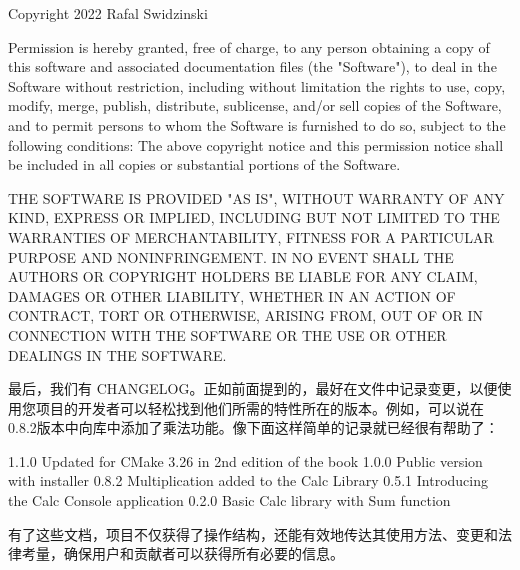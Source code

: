 \begin{shell}
Copyright 2022 Rafal Swidzinski

Permission is hereby granted, free of charge, to any person obtaining a
copy of this software and associated documentation files (the "Software"),
to deal in the Software without restriction, including without limitation
the rights to use, copy, modify, merge, publish, distribute, sublicense,
and/or sell copies of the Software, and to permit persons to whom the
Software is furnished to do so, subject to the following conditions:
The above copyright notice and this permission notice shall be included in
all copies or substantial portions of the Software.

THE SOFTWARE IS PROVIDED "AS IS", WITHOUT WARRANTY OF ANY KIND, EXPRESS OR
IMPLIED, INCLUDING BUT NOT LIMITED TO THE WARRANTIES OF MERCHANTABILITY,
FITNESS FOR A PARTICULAR PURPOSE AND NONINFRINGEMENT. IN NO EVENT SHALL
THE AUTHORS OR COPYRIGHT HOLDERS BE LIABLE FOR ANY CLAIM, DAMAGES OR OTHER
LIABILITY, WHETHER IN AN ACTION OF CONTRACT, TORT OR OTHERWISE, ARISING
FROM, OUT OF OR IN CONNECTION WITH THE SOFTWARE OR THE USE OR OTHER
DEALINGS IN THE SOFTWARE.
\end{shell}

最后，我们有 CHANGELOG。正如前面提到的，最好在文件中记录变更，以便使用您项目的开发者可以轻松找到他们所需的特性所在的版本。例如，可以说在0.8.2版本中向库中添加了乘法功能。像下面这样简单的记录就已经很有帮助了：


\begin{shell}
1.1.0 Updated for CMake 3.26 in 2nd edition of the book
1.0.0 Public version with installer
0.8.2 Multiplication added to the Calc Library
0.5.1 Introducing the Calc Console application
0.2.0 Basic Calc library with Sum function
\end{shell}

有了这些文档，项目不仅获得了操作结构，还能有效地传达其使用方法、变更和法律考量，确保用户和贡献者可以获得所有必要的信息。







































